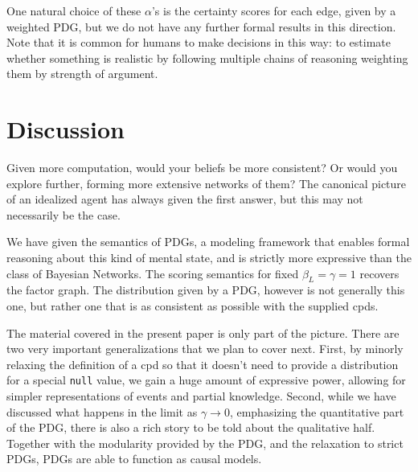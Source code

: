 \documentclass{article}
\theoremstyle{plain}
\newtheorem{conj}[theorem]{Conjecture}
\theoremstyle{definition}
\theoremstyle{remark}
\DeclarePairedDelimiter{\bbr}{\llbracket}{\rrbracket}
\newcommand\MaxEnt{_{\mathbf H}}
\newcommand{\MN}{PDG}
\numberwithin{equation}{section}
\begin{document}
\begin{vfull}
	One natural choice of these $\alpha$'s is the certainty scores for each edge, given by a weighted \MN, but we do not have any further formal results in this direction.
	Note that it is common for humans to make decisions in this way: to estimate whether something is realistic by following multiple chains of reasoning weighting them by strength of argument.
	
	\end{vfull}



	\section{Discussion}

	Given more computation, would your beliefs be more consistent? Or would you explore further, forming more extensive networks of them?
	The canonical picture of an idealized agent has always given the first answer, but this may not necessarily be the case.
 
	
	We have given the semantics of PDGs, a modeling framework that enables formal reasoning about this kind of mental state, and is strictly more expressive than the class of Bayesian Networks. The scoring semantics for fixed $\beta_L = \gamma = 1$ recovers the factor graph. The distribution given by a PDG, however is not generally this one, but rather one that is as consistent as possible with the supplied cpds.

	The material covered in the present paper is only part of the picture. There are two very important generalizations that we plan to cover next. First, by minorly relaxing the definition of a cpd so that it doesn't need to provide a distribution for a special \texttt{null} value, we gain a huge amount of expressive power, allowing for simpler representations of events and partial knowledge.
 	Second, while we have discussed what happens in the limit as $\gamma \to 0$, emphasizing the quantitative part of the PDG, there is also a rich story to be told about the qualitative half. Together with the modularity provided by the PDG, and the relaxation to strict PDGs, PDGs are able to function as causal models.
\end{document}

